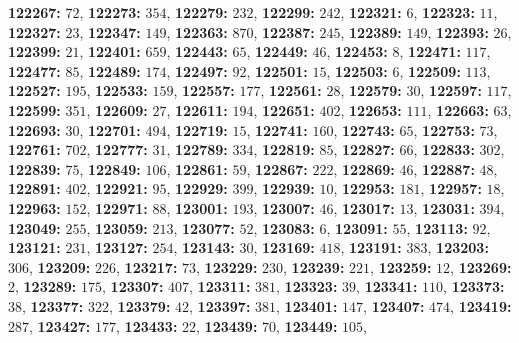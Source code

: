 \textsf{\bfseries 122267:} $72$, \textsf{\bfseries 122273:} $354$, \textsf{\bfseries 122279:} $232$, \textsf{\bfseries 122299:} $242$, \textsf{\bfseries 122321:} $6$, \textsf{\bfseries 122323:} $11$, \textsf{\bfseries 122327:} $23$, \textsf{\bfseries 122347:} $149$, \textsf{\bfseries 122363:} $870$, \textsf{\bfseries 122387:} $245$, \textsf{\bfseries 122389:} $149$, \textsf{\bfseries 122393:} $26$, \textsf{\bfseries 122399:} $21$, \textsf{\bfseries 122401:} $659$, \textsf{\bfseries 122443:} $65$, \textsf{\bfseries 122449:} $46$, \textsf{\bfseries 122453:} $8$, \textsf{\bfseries 122471:} $117$, \textsf{\bfseries 122477:} $85$, \textsf{\bfseries 122489:} $174$, \textsf{\bfseries 122497:} $92$, \textsf{\bfseries 122501:} $15$, \textsf{\bfseries 122503:} $6$, \textsf{\bfseries 122509:} $113$, \textsf{\bfseries 122527:} $195$, \textsf{\bfseries 122533:} $159$, \textsf{\bfseries 122557:} $177$, \textsf{\bfseries 122561:} $28$, \textsf{\bfseries 122579:} $30$, \textsf{\bfseries 122597:} $117$, \textsf{\bfseries 122599:} $351$, \textsf{\bfseries 122609:} $27$, \textsf{\bfseries 122611:} $194$, \textsf{\bfseries 122651:} $402$, \textsf{\bfseries 122653:} $111$, \textsf{\bfseries 122663:} $63$, \textsf{\bfseries 122693:} $30$, \textsf{\bfseries 122701:} $494$, \textsf{\bfseries 122719:} $15$, \textsf{\bfseries 122741:} $160$, \textsf{\bfseries 122743:} $65$, \textsf{\bfseries 122753:} $73$, \textsf{\bfseries 122761:} $702$, \textsf{\bfseries 122777:} $31$, \textsf{\bfseries 122789:} $334$, \textsf{\bfseries 122819:} $85$, \textsf{\bfseries 122827:} $66$, \textsf{\bfseries 122833:} $302$, \textsf{\bfseries 122839:} $75$, \textsf{\bfseries 122849:} $106$, \textsf{\bfseries 122861:} $59$, \textsf{\bfseries 122867:} $222$, \textsf{\bfseries 122869:} $46$, \textsf{\bfseries 122887:} $48$, \textsf{\bfseries 122891:} $402$, \textsf{\bfseries 122921:} $95$, \textsf{\bfseries 122929:} $399$, \textsf{\bfseries 122939:} $10$, \textsf{\bfseries 122953:} $181$, \textsf{\bfseries 122957:} $18$, \textsf{\bfseries 122963:} $152$, \textsf{\bfseries 122971:} $88$, \textsf{\bfseries 123001:} $193$, \textsf{\bfseries 123007:} $46$, \textsf{\bfseries 123017:} $13$, \textsf{\bfseries 123031:} $394$, \textsf{\bfseries 123049:} $255$, \textsf{\bfseries 123059:} $213$, \textsf{\bfseries 123077:} $52$, \textsf{\bfseries 123083:} $6$, \textsf{\bfseries 123091:} $55$, \textsf{\bfseries 123113:} $92$, \textsf{\bfseries 123121:} $231$, \textsf{\bfseries 123127:} $254$, \textsf{\bfseries 123143:} $30$, \textsf{\bfseries 123169:} $418$, \textsf{\bfseries 123191:} $383$, \textsf{\bfseries 123203:} $306$, \textsf{\bfseries 123209:} $226$, \textsf{\bfseries 123217:} $73$, \textsf{\bfseries 123229:} $230$, \textsf{\bfseries 123239:} $221$, \textsf{\bfseries 123259:} $12$, \textsf{\bfseries 123269:} $2$, \textsf{\bfseries 123289:} $175$, \textsf{\bfseries 123307:} $407$, \textsf{\bfseries 123311:} $381$, \textsf{\bfseries 123323:} $39$, \textsf{\bfseries 123341:} $110$, \textsf{\bfseries 123373:} $38$, \textsf{\bfseries 123377:} $322$, \textsf{\bfseries 123379:} $42$, \textsf{\bfseries 123397:} $381$, \textsf{\bfseries 123401:} $147$, \textsf{\bfseries 123407:} $474$, \textsf{\bfseries 123419:} $287$, \textsf{\bfseries 123427:} $177$, \textsf{\bfseries 123433:} $22$, \textsf{\bfseries 123439:} $70$, \textsf{\bfseries 123449:} $105$, 

